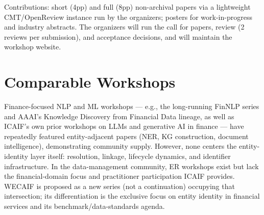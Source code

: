 \documentclass[12pt]{article}
\begin{document}
Contributions: short (4pp) and full (8pp) non-archival papers via a
lightweight CMT/OpenReview instance run by the organizers; posters for
work-in-progress and industry abstracts. The organizers will run the
call for papers, review (2 reviews per submission), and acceptance
decisions, and will maintain the workshop website.

\section{Comparable Workshops}

Finance-focused NLP and ML workshops --- e.g., the long-running
FinNLP series and AAAI's Knowledge Discovery from Financial Data
lineage, as well as ICAIF's own prior workshops on LLMs and
generative AI in finance --- have repeatedly featured entity-adjacent
papers (NER, KG construction, document intelligence), demonstrating
community supply. However, none centers the entity-identity layer
itself: resolution, linkage, lifecycle dynamics, and identifier
infrastructure. In the data-management community, ER workshops exist
but lack the financial-domain focus and practitioner participation
ICAIF provides. WECAIF is proposed as a new series (not a
continuation) occupying that intersection; its differentiation is the
exclusive focus on entity identity in financial services and its
benchmark/data-standards agenda.
\end{document}
